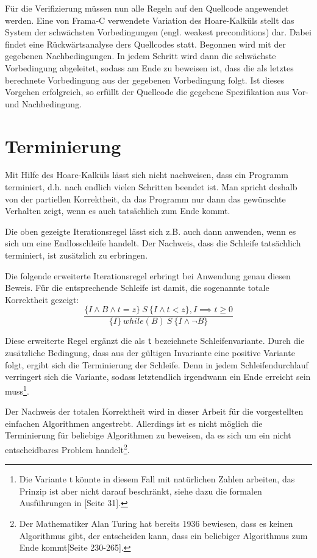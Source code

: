 Für die Verifizierung müssen nun alle Regeln auf den Quellcode angewendet werden. Eine von Frama-C verwendete Variation des Hoare-Kalküls
stellt das System der schwächsten Vorbedingungen (engl. weakest preconditions) dar. Dabei findet eine Rückwärtsanalyse
ders Quellcodes statt. Begonnen wird mit der gegebenen Nachbedingungen. In jedem Schritt wird dann die schwächste Vorbedingung
abgeleitet, sodass am Ende zu beweisen ist, dass die als letztes berechnete Vorbedingung aus der gegebenen Vorbedingung folgt.
Ist dieses Vorgehen erfolgreich, so erfüllt der Quellcode die gegebene Spezifikation aus Vor- und Nachbedingung.

\section{Terminierung}

Mit Hilfe des Hoare-Kalküls lässt sich nicht nachweisen, dass ein Programm terminiert, d.h. nach endlich vielen Schritten 
beendet ist. Man spricht deshalb von der partiellen Korrektheit, da das Programm nur dann das gewünschte 
Verhalten zeigt, wenn es auch tatsächlich zum Ende kommt.

Die oben gezeigte Iterationsregel lässt sich z.B. auch dann anwenden, wenn es sich um eine Endlosschleife handelt. Der Nachweis,
dass die Schleife tatsächlich terminiert, ist zusätzlich zu erbringen. 

Die folgende erweiterte Iterationsregel erbringt bei Anwendung genau diesen Beweis. Für die entsprechende Schleife ist damit, die
sogenannte totale Korrektheit gezeigt:
\begin{displaymath}
\frac{\{I \land B \land t = z \} \:S\: \{I \land t < z\}, I \implies t \geq 0}{\{I\}\: while(B)\: S\: \{I \land \neg B\}}
\end{displaymath}

Diese erweiterte Regel ergänzt die als \lstinline{t} bezeichnete Schleifenvariante. Durch die zusätzliche Bedingung, dass aus der gültigen Invariante
eine positive Variante folgt, ergibt sich die Terminierung der Schleife. Denn in jedem Schleifendurchlauf verringert sich die Variante,
sodass letztendlich irgendwann ein Ende erreicht sein muss\footnote{Die Variante t könnte in diesem Fall mit natürlichen Zahlen arbeiten,
das Prinzip ist aber nicht darauf beschränkt, siehe dazu die formalen Ausführungen in \cite{floyd}[Seite 31].}.

Der Nachweis der totalen Korrektheit wird in dieser Arbeit für die vorgestellten einfachen Algorithmen angestrebt.
Allerdings ist es nicht möglich die Terminierung für beliebige Algorithmen zu beweisen, da es sich um ein nicht entscheidbares 
Problem handelt\footnote{Der Mathematiker Alan Turing hat bereits 1936 bewiesen, dass es keinen Algorithmus gibt, der 
entscheiden kann, dass ein beliebiger Algorithmus zum Ende kommt\cite{turing}[Seite 230-265].}.

